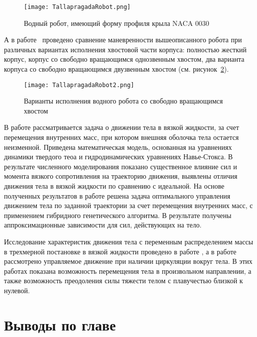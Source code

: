 \begin{figure}[h]
	\centering
	\texttt{[image: TallapragadaRobot.png]}%
	\caption{Водный робот, имеющий форму профиля крыла NACA 0030}
	\label{TallapragadaRobot}
\end{figure}

А в работе~\cite{Pollard_Tallapragada_2019} проведено сравнение маневренности вышеописанного робота при различных вариантах исполнения хвостовой части корпуса: полностью жесткий корпус, корпус со свободно вращающимся однозвенным хвостом, два варианта корпуса со свободно вращающимся двузвенным хвостом (см. рисунок~\ref{TallapragadaRobot2}). 

\begin{figure}[h]
	\centering
	\texttt{[image: TallapragadaRobot2.png]}%
	\caption{Варианты исполнения водного робота со свободно вращающимся хвостом}
	\label{TallapragadaRobot2}
\end{figure}



В работе \cite{Ramodanov_Tenenev} рассматривается задача о движении тела в вязкой жидкости, за счет перемещения внутренних масс, при котором внешняя оболочка тела остается неизменной. Приведена математическая модель, основанная на уравнениях динамики твердого теоа и гидродинамических уравнениях Навье-Стокса. В результате численного моделирования показано существенное влияние сил и момента вязкого сопротивления на траекторию движения, выявлены отличия движения тела в вязкой жидкости по сравнению с идеальной. На основе полученных результатов в работе \cite{Vetchanin_Tenenev_2011} решена задача оптимального управления движением тела по заданной траектории за счет перемещения внутренних масс, с применением гибридного генетического алгоритма. В результате получены аппроксимационные зависимости для сил, действующих на тело.

Исследование характеристик движения тела с переменным распределением массы в трехмерной постановке в вязкой жидкости проведено в работе \cite{Vetchanin_Mamaev_Tenenev_ND_2012}, а в работе \cite{Vetchanin_Kilin_2017} рассмотрено управляемое движение при наличии циркуляции вокруг тела. В этих работах показана возможность перемещения тела в произвольном направлении, а также возможность преодоления силы тяжести телом с плавучестью близкой к нулевой.

\section{Выводы по главе}

